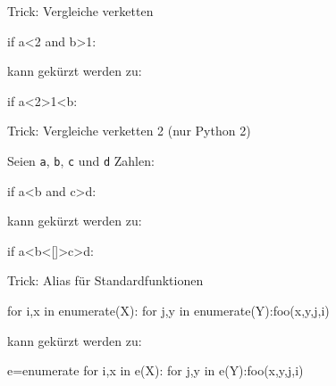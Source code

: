 \documentclass[xcolor=dvipsnames, aspectratio=169, 14pt]{beamer}
\begin{document}
\begin{frame}[fragile]{Trick: Vergleiche verketten}
	\begin{python3code}
	if a<2 and b>1:
	\end{python3code}
	
	\vfill
	
	kann gekürzt werden zu:
	
	\vfill
	
	\begin{python3code}
	if a<2>1<b:
	\end{python3code}
\end{frame}

\begin{frame}[fragile]{Trick: Vergleiche verketten 2}
	(nur Python 2)
	
	\vfill
	
	Seien \texttt{a}, \texttt{b}, \texttt{c} und \texttt{d} Zahlen:
	
	\vfill
	
	\begin{python3code}
	if a<b and c>d:
	\end{python3code}
	
	\vfill
	
	kann gekürzt werden zu:
	
	\vfill
	
	\begin{python3code}
	if a<b<[]>c>d:
	\end{python3code}
\end{frame}


\begin{frame}[fragile]{Trick: Alias für Standardfunktionen}
	\begin{python3code}
	for i,x in enumerate(X):
	   for j,y in enumerate(Y):foo(x,y,j,i)
	\end{python3code}
	
	\vfill
	
	kann gekürzt werden zu:
	
	\vfill
	
	\begin{python3code}
	e=enumerate
	for i,x in e(X):
	   for j,y in e(Y):foo(x,y,j,i)
	\end{python3code}
\end{frame}

\end{document}
